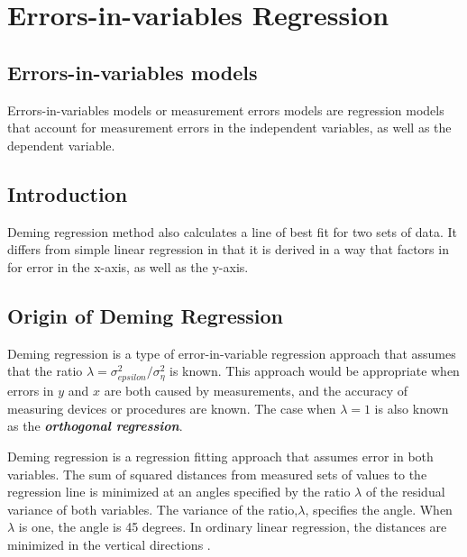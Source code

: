 \documentclass[12pt, a4paper]{report}
\theoremstyle{plain}
\theoremstyle{definition}
\theoremstyle{remark}
\begin{document}
\chapter{Errors-in-variables Regression}





\section{Errors-in-variables models}

Errors-in-variables models or measurement errors models are regression models that account for measurement errors in the independent variables, as well as the dependent variable.

\section{Introduction}

Deming regression method also calculates a line of best fit for two sets of data. It differs from simple linear regression in that it is derived in a way that factors in for error in the x-axis, as
well as the y-axis.



\section{Origin of Deming Regression}

Deming regression is a type of error-in-variable regression approach that assumes that the ratio $\lambda = \sigma^2_{epsilon}/\sigma^2_{\eta}$ is known. This approach would be appropriate when errors in $y$ and $x$ are both caused by measurements, and the accuracy of measuring devices or procedures are known. The case when $\lambda = 1$ is also known as the \textbf{\emph{orthogonal regression}}.

Deming regression is a regression fitting approach that assumes error in both variables.
The sum of squared distances from measured sets of values to the regression line is minimized at an angles specified by the ratio $\lambda$ of the residual variance of both variables. The variance of the ratio,$\lambda$, specifies the angle.  When $\lambda$ is one, the angle is 45 degrees. In ordinary linear regression, the distances are minimized in the vertical directions \citep{linnet99}.
\end{document}
